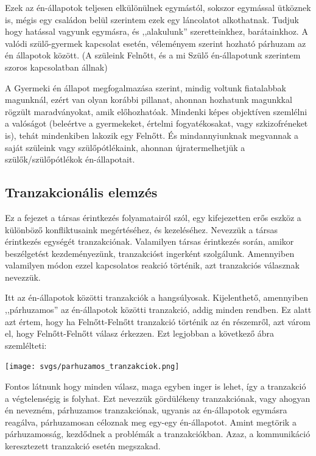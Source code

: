 \documentclass[a4paper,12pt]{article}
\begin{document}
	Ezek az én-állapotok teljesen elkülönülnek egymástól, sokszor egymással ütköznek is, mégis egy családon belül szerintem ezek egy láncolatot alkothatnak. Tudjuk hogy hatással vagyunk egymásra, és ,,alakulunk'' szeretteinkhez, barátainkhoz. A valódi szülő-gyermek kapcsolat esetén, véleményem szerint hozható párhuzam az én állapotok között. (A szüleink Felnőtt, és a mi Szülő én-állapotunk szerintem szoros kapcsolatban állnak)
	
	A Gyermeki én állapot megfogalmazása szerint, mindig voltunk fiatalabbak magunknál, ezért van olyan korábbi pillanat, ahonnan hozhatunk magunkkal rögzült maradványokat, amik előhozhatóak. 
	Mindenki képes objektíven szemlélni a valóságot (beleértve a gyermekeket, értelmi fogyatékosakat, vagy szkizofréneket is), tehát mindenkiben lakozik egy Felnőtt. És mindannyiunknak megvannak a saját szüleink vagy szülőpótlékaink, ahonnan újratermelhetjük a szülők/szülőpótlékok én-állapotait. 
	
	\subsection{Tranzakcionális elemzés}
	Ez a fejezet a társas érintkezés folyamatairól szól, egy kifejezetten erős eszköz a különböző konfliktusaink megértéséhez, és kezeléséhez. Nevezzük a társas érintkezés egységét tranzakciónak. Valamilyen társas érintkezés során, amikor beszélgetést kezdeményezünk, tranzakcióst ingerként szolgálunk. Amennyiben valamilyen módon ezzel kapcsolatos reakció történik, azt tranzakciós válasznak nevezzük.
	
	Itt az én-állapotok közötti tranzakciók a hangsúlyosak. Kijelenthető, amennyiben ,,párhuzamos'' az én-állapotok közötti tranzakció, addig minden rendben. Ez alatt azt értem, hogy ha Felnőtt-Felnőtt tranzakció történik az én részemről, azt várom el, hogy Felnőtt-Felnőtt válasz érkezzen. Ezt legjobban a következő ábra szemlélteti: \\[0.3cm]
	
	\begin{center}
		\texttt{[image: svgs/parhuzamos\_tranzakciok.png]} \\[0.5cm]
	\end{center}
	Fontos látnunk hogy minden válasz, maga egyben inger is lehet, így a tranzakció a végtelenségig is folyhat. Ezt nevezzük gördülékeny tranzakciónak, vagy ahogyan én nevezném, párhuzamos tranzakciónak, ugyanis az én-állapotok egymásra reagálva, párhuzamosan céloznak meg egy-egy én-állapotot. Amint megtörik a párhuzamosság, kezdődnek a problémák a tranzakciókban. Azaz, a kommunikáció keresztezett tranzakció esetén megszakad.
	
\end{document}
